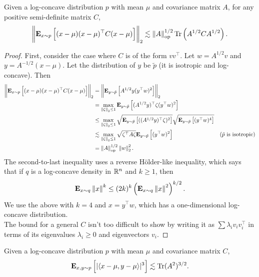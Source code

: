 \documentclass{article}
\begin{document}
		\begin{lemma}
			\label{lee-vem: growth lemma 1}
			Given a log-concave distribution $p$ with mean $\mu$ and covariance matrix $A$, for any positive semi-definite matrix $C$,
			\[ \left\lVert\textbf{E}_{x\sim p}\left[(x-\mu)(x-\mu)^\top C (x-\mu)\right]\right\rVert_2 \lesssim \left\lVert A\right\rVert_{\text{op}}^{1/2} \operatorname{Tr}\left(A^{1/2}CA^{1/2}\right). \]
		\end{lemma}
		\begin{proof}
			First, consider the case where $C$ is of the form $vv^\top$. Let $w = A^{1/2}v$ and $y = A^{-1/2}(x-\mu)$. Let the distribution of $y$ be $\tilde{p}$ (it is isotropic and log-concave). Then
			\begin{align*}
				\left\lVert\textbf{E}_{x \sim p}\left[(x-\mu)(x-\mu)^\top C (x-\mu)\right]\right\rVert_2 &= \left\lVert\textbf{E}_{y\sim \tilde{p}}\left[A^{1/2}y(y^\top w)^2\right]\right\rVert_2 \\
					&= \max_{\left\lVert\zeta\right\rVert_2 \leq 1} \textbf{E}_{y\sim\tilde{p}}\left[(A^{1/2}y)^\top \zeta (y^\top w)^2\right] \\
					&\leq \max_{\left\lVert\zeta\right\rVert_2 \leq 1} \sqrt{\textbf{E}_{y\sim\tilde{p}}\left[((A^{1/2}y)^\top \zeta)^2\right]} \sqrt{\textbf{E}_{y\sim\tilde{p}} \left[(y^\top w)^4\right]} \\
					&\lesssim \max_{\left\lVert\zeta\right\rVert_2 \leq 1} \sqrt{\zeta^\top A \zeta} \textbf{E}_{y \sim \tilde{p}} \left[(y^\top w)^2\right] & (\tilde{p}\text{ is isotropic}) \\
					&= \left\lVert A\right\rVert_{\text{op}}^{1/2} \left\lVert w\right\rVert_2^2.
			\end{align*}
			The second-to-last inequality uses a reverse H\"{o}lder-like inequality, which says that if $q$ is a log-concave density in $\mathbb{R}^n$ and $k\geq 1$, then
			\[ \textbf{E}_{x \sim q} \left\lVert x\right\rVert^k \leq (2k)^k \left(\textbf{E}_{x \sim q} \left\lVert x\right\rVert^2 \right)^{k/2}. \]
			We use the above with $k=4$ and $x = y^\top w$, which has a one-dimensional log-concave distribution.\\
			The bound for a general $C$ isn't too difficult to show by writing it as $\sum \lambda_i v_i v_i^\top$ in terms of its eigenvalues $\lambda_i \geq 0$ and eigenvectors $v_i$.
		\end{proof}

		\begin{lemma}
			\label{lee-vem: growth lemma 2}
			Given a log-concave distribution $p$ with mean $\mu$ and covariance matrix $C$,
			\[ \textbf{E}_{x,y \sim p} \left[ |\langle x-\mu,y-\mu\rangle|^3 \right] \lesssim \operatorname{Tr}(A^2)^{3/2}. \]
		\end{lemma}
\end{document}
